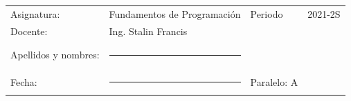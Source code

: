 \documentclass[12pt]{exam}
\begin{document}
\begin{table}[H]
  \centering
  \begin{tabular}[H]{llll}
    Asignatura: & Fundamentos de Programación & Periodo & 2021-2S\\
    Docente: & Ing. Stalin Francis &  & \\
              &                     &            & \\     
    Apellidos y nombres: &\rule{7cm}{0.4pt}    &  & \\
              &                     &            & \\
    Fecha: &\rule{5cm}{0.4pt}   & Paralelo: A & \\
  \end{tabular}
\end{table}
\end{document}
